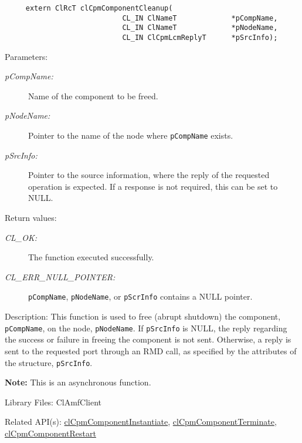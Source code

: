 {\begin{Desc}
\footnotesize\begin{verbatim}     extern ClRcT clCpmComponentCleanup(
                			CL_IN ClNameT             *pCompName,
                			CL_IN ClNameT             *pNodeName,
                			CL_IN ClCpmLcmReplyT      *pSrcInfo);
\end{verbatim}
\normalsize
\end{Desc}
\begin{Desc}
\item[Parameters:]
\begin{description}
\item[{\em p\-Comp\-Name:}]Name of the component to be freed. 
\item[{\em p\-Node\-Name:}]Pointer to the name of the node where {\tt{p\-Comp\-Name}} exists.
\item[{\em p\-Src\-Info:}]Pointer to the source information, where the reply of the requested operation is expected. If a response is not required, this 
can be set to NULL.\end{description}
\end{Desc}
\begin{Desc}
\item[Return values:]
\begin{description}
\item[{\em CL\_\-OK:}]The function executed successfully. 
\item[{\em CL\_\-ERR\_\-NULL\_\-POINTER:}]{\tt{p\-Comp\-Name}}, {\tt{p\-Node\-Name}}, or {\tt{p\-Scr\-Info}} contains a NULL pointer.\end{description}
\end{Desc}
\begin{Desc}
\item[Description:]This function is used to free (abrupt shutdown) the component, {\tt{p\-Comp\-Name}}, on the node, {\tt{p\-Node\-Name}}. If 
{\tt{p\-Src\-Info}} is NULL, the reply regarding the success or failure in freeing the component is not sent. Otherwise, a reply is sent to the requested 
port through an RMD call, as specified by the attributes of the structure, {\tt{p\-Src\-Info}}.\end{Desc}
{\bf Note:} This is an asynchronous function.
\begin{Desc}
\item[Library Files:]Cl\-Amf\-Client\end{Desc}

\begin{Desc}
\item[Related API(s):]\hyperlink{group__group14}{cl\-Cpm\-Component\-Instantiate}, \hyperlink{group__group14}{cl\-Cpm\-Component\-Terminate}, 
\hyperlink{group__group14}{cl\-Cpm\-Component\-Restart} \end{Desc}
\newpage




}
